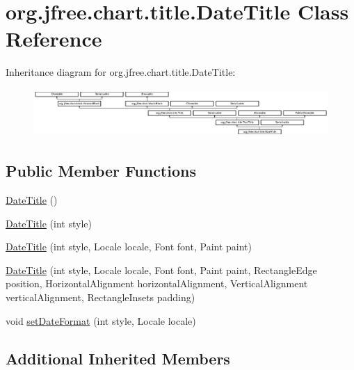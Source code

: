 \hypertarget{classorg_1_1jfree_1_1chart_1_1title_1_1_date_title}{}\section{org.\+jfree.\+chart.\+title.\+Date\+Title Class Reference}
\label{classorg_1_1jfree_1_1chart_1_1title_1_1_date_title}
Inheritance diagram for org.\+jfree.\+chart.\+title.\+Date\+Title\+:\begin{figure}[H]
\begin{center}
\leavevmode
\includegraphics[height=1.834862cm]{classorg_1_1jfree_1_1chart_1_1title_1_1_date_title}
\end{center}
\end{figure}
\subsection*{Public Member Functions}
\begin{DoxyCompactItemize}
\item 
\mbox{\hyperlink{classorg_1_1jfree_1_1chart_1_1title_1_1_date_title_a061f618ba94f5fc912a1d666d745de5b}{Date\+Title}} ()
\item 
\mbox{\hyperlink{classorg_1_1jfree_1_1chart_1_1title_1_1_date_title_a27c04018a19f116822c98019e380b6b0}{Date\+Title}} (int style)
\item 
\mbox{\hyperlink{classorg_1_1jfree_1_1chart_1_1title_1_1_date_title_a6c19017125745efe8c80e7a91b307676}{Date\+Title}} (int style, Locale locale, Font font, Paint paint)
\item 
\mbox{\hyperlink{classorg_1_1jfree_1_1chart_1_1title_1_1_date_title_a15ad8c6e7d231cf7131d56043b5a22dd}{Date\+Title}} (int style, Locale locale, Font font, Paint paint, Rectangle\+Edge position, Horizontal\+Alignment horizontal\+Alignment, Vertical\+Alignment vertical\+Alignment, Rectangle\+Insets padding)
\item 
void \mbox{\hyperlink{classorg_1_1jfree_1_1chart_1_1title_1_1_date_title_a476f7d83cbb6221fab6a97c04ba9c262}{set\+Date\+Format}} (int style, Locale locale)
\end{DoxyCompactItemize}
\subsection*{Additional Inherited Members}


